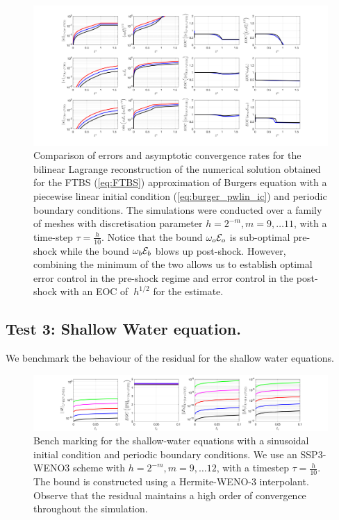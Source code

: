 \documentclass[final]{amsart}
\numberwithin{equation}{section}
\begin{document}
\begin{figure}[H] 
	\includegraphics[width=\textwidth]{../figures/fig_FTBS_postshock_bound_comparison_L2L1L1_burgers_offset_0_hatIC}	
	\caption{
		\label{fig:FTBS_burger_step}
		Comparison of errors and asymptotic convergence rates for the bilinear Lagrange reconstruction of the numerical solution obtained for the FTBS (\ref{eq:FTBS})
		approximation of Burgers equation with a piecewise linear initial condition
		(\ref{eq:burger_pwlin_ic}) and periodic boundary conditions. The simulations were conducted over a family of
		meshes with discretisation parameter $h = 2^{-m}, m = 9,\dots 11$,
		with a time-step $\tau = \tfrac{h}{10}$. Notice that the bound $\omega_o\mathcal{E}_o$ is sub-optimal pre-shock while the bound $\omega_b\mathcal{E}_b$ blows up post-shock.  However, combining the minimum of the two allows us to establish optimal error control in the pre-shock regime and error control in the post-shock with an EOC of $~h^{1/2}$ for the estimate.}
\end{figure}




\subsection{Test 3:  Shallow Water equation.  }  We benchmark the behaviour of the residual for the shallow water equations.
\begin{figure}[H]	
	\includegraphics[width=\textwidth]{../figures/fig_SHW_RK3_WENO3_rec3_fixed_gsplots_1x5_sin_IC_P3_shw}	
	\caption{\label{fig:SSP3WENO_SHW} Bench marking for the shallow-water equations with a sinusoidal initial condition and periodic boundary conditions. We use an SSP3-WENO3 scheme with $h = 2^{-m}, m = 9,\dots 12$,
		with a timestep $\tau = \tfrac{h}{10}$.  The bound is constructed using a Hermite-WENO-3 interpolant.  Observe that the residual maintains a high order of convergence throughout the simulation.}
\end{figure}
\end{document}
